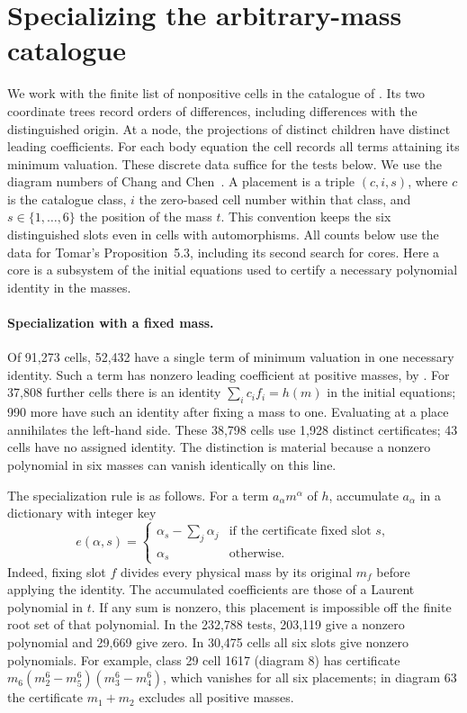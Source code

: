 \documentclass[11pt,letterpaper]{article}
\theoremstyle{definition}
\begin{document}
\section{Specializing the arbitrary-mass catalogue}\label{early:census}

We work with the finite list of nonpositive cells in the catalogue of
\cite[Props.~3.1, 4.5 and 5.3]{Tomar}. Its two coordinate trees record orders
of differences, including differences with the distinguished origin. At a node,
the projections of distinct children have distinct leading coefficients. For
each body equation the cell records all terms attaining its minimum valuation.
These discrete data suffice for the tests below. We use the diagram numbers of
Chang and Chen~\cite{CC}. A placement is a triple $(c,i,s)$, where $c$ is
the catalogue class, $i$ the zero-based cell number within that class, and
$s\in\{1,\ldots,6\}$ the position of the mass $t$. This convention keeps the
six distinguished slots even in cells with automorphisms. All counts below use
the data for Tomar's Proposition~5.3, including its second search for cores. Here a core is a subsystem of the initial equations used to certify a necessary polynomial identity in the masses.

\paragraph{Specialization with a fixed mass.}
Of 91,273 cells, 52,432 have a single term of minimum valuation in one
necessary identity. Such a term has nonzero leading coefficient at positive
masses, by \cite[Lemma~5.1]{Tomar}. For 37,808 further cells there is an
identity $\sum_i c_i f_i=h(m)$ in the initial equations; 990 more have such
an identity after fixing a mass to one. Evaluating at a place annihilates
the left-hand side. These 38,798 cells use 1,928 distinct certificates;
43 cells have no assigned identity. The distinction is material because
a nonzero polynomial in six masses can vanish identically on this line.

The specialization rule is as follows. For a term $a_\alpha m^\alpha$ of $h$,
accumulate $a_\alpha$ in a dictionary with integer key
\[
e(\alpha,s)=
  \begin{cases}
   \alpha_s-\sum_j\alpha_j & \text{if the certificate fixed slot }s,\\
   \alpha_s & \text{otherwise}.
  \end{cases}
\]
Indeed, fixing slot $f$ divides every physical mass by its original
$m_f$ before applying the identity. The accumulated coefficients are those
of a Laurent polynomial in $t$. If any sum is nonzero, this placement is
impossible off the finite root set of that polynomial. In the 232,788
tests, 203,119 give a nonzero polynomial and 29,669 give zero. In 30,475
cells all six slots give nonzero polynomials. For example, class 29 cell
1617 (diagram 8) has certificate
$m_6(m_2^6-m_5^6)(m_3^6-m_4^6)$, which vanishes for all six placements;
in diagram 63 the certificate $m_1+m_2$ excludes all positive masses.
\end{document}
